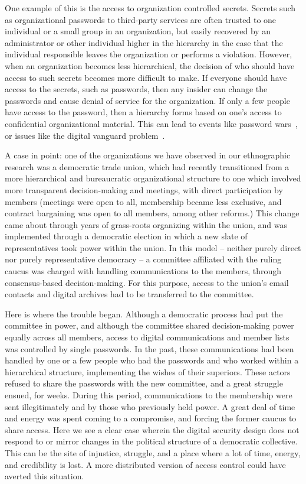 One example of this is the access to organization controlled secrets. Secrets
such as organizational passwords to third-party services are often trusted to
one individual or a small group in an organization, but easily recovered by an
administrator or other individual higher in the hierarchy in the case that the
individual responsible leaves the organization or performs a violation. However,
when an organization becomes less hierarchical, the decision of who should have
access to such secrets becomes more difficult to make. If everyone should have
access to the secrets, such as passwords, then any insider can change the
passwords and cause denial of service for the organization. If only a few people
have access to the password, then a hierarchy forms based on one's access to
confidential organizational material. This can lead to events like password 
wars~\cite{kavada2020counterpublics}, or issues like the digital vanguard
problem~\cite{gerbaudo2017social}.

A case in point: one of the organizations we have observed in our ethnographic
research was a democratic trade union, which had recently transitioned from a
more hierarchical and bureaucratic organizational structure to one which
involved more transparent decision-making and meetings, with direct
participation by members (meetings were open to all, membership became less
exclusive, and contract bargaining was open to all members, among other
reforms.) This change came about through years of grass-roots organizing within
the union, and was implemented through a democratic election in which a new
slate of representatives took power within the union. In this model -- neither
purely direct nor purely representative democracy -- a committee affiliated with
the ruling caucus was charged with handling communications to the members,
through consensus-based decision-making. For this purpose, access to the union's
email contacts and digital archives had to be transferred to the committee. 

Here is where the trouble began. Although a democratic process had put the
committee in power, and although the committee shared decision-making power
equally across all members, access to digital communications and member lists
was controlled by single passwords. In the past, these communications had been
handled by one or a few people who had the passwords and who worked within a
hierarchical structure, implementing the wishes of their superiors. These actors
refused to share the passwords with the new committee, and a great struggle
ensued, for weeks. During this period, communications to the membership were
sent illegitimately and by those who previously held power. A great deal of time
and energy was spent coming to a compromise, and forcing the former caucus to
share access. Here we see a clear case wherein the digital security design does
not respond to or mirror changes in the political structure of a democratic
collective. This can be the site of injustice, struggle, and a place where a lot
of time, energy, and credibility is lost. A more distributed version of access
control could have averted this situation.

